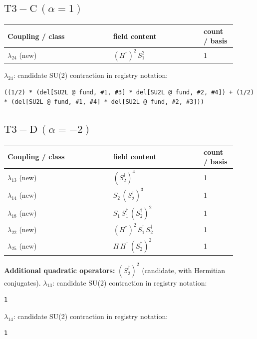 \documentclass[9pt,a4paper]{article}
\begin{document}
\subsection*{$ \mathrm{T3-C}\,(\alpha=1) $}
\begin{longtable}{@{}p{0.42\linewidth}p{0.36\linewidth}p{0.13\linewidth}@{}}
\toprule
Coupling / class & field content & count / basis\\
\midrule
\endhead
$\lambda_{24}$ (new) & $\left(H^\dagger\right)^{2}\, S_1^{2}$ & 1 \\
\bottomrule
\end{longtable}
\textbf{$ \lambda_{24} $}: candidate SU(2) contraction in registry notation:
\begin{lstlisting}[mathescape=true]
((1/2) * (del[SU2L @ fund, #1, #3] * del[SU2L @ fund, #2, #4]) + (1/2) * (del[SU2L @ fund, #1, #4] * del[SU2L @ fund, #2, #3]))
\end{lstlisting}

\subsection*{$ \mathrm{T3-D}\,(\alpha=-2) $}
\begin{longtable}{@{}p{0.42\linewidth}p{0.36\linewidth}p{0.13\linewidth}@{}}
\toprule
Coupling / class & field content & count / basis\\
\midrule
\endhead
$\lambda_{13}$ (new) & $\left(S_2^\dagger\right)^{4}$ & 1 \\
$\lambda_{14}$ (new) & $S_2\, \left(S_2^\dagger\right)^{3}$ & 1 \\
$\lambda_{18}$ (new) & $S_1\, S_1^\dagger\, \left(S_2^\dagger\right)^{2}$ & 1 \\
$\lambda_{22}$ (new) & $\left(H^\dagger\right)^{2}\, S_1^\dagger\, S_2^\dagger$ & 1 \\
$\lambda_{25}$ (new) & $H\, H^\dagger\, \left(S_2^\dagger\right)^{2}$ & 1 \\
\bottomrule
\end{longtable}
\textbf{Additional quadratic operators:}
$\left(S_2^\dagger\right)^{2}$ (candidate, with Hermitian conjugates).
\textbf{$ \lambda_{13} $}: candidate SU(2) contraction in registry notation:
\begin{lstlisting}[mathescape=true]
1
\end{lstlisting}

\textbf{$ \lambda_{14} $}: candidate SU(2) contraction in registry notation:
\begin{lstlisting}[mathescape=true]
1
\end{lstlisting}
\end{document}
